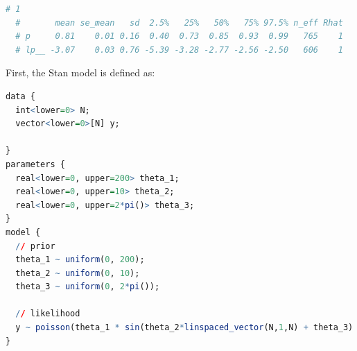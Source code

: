\documentclass{article}
\begin{document}



\begin{lstlisting}[language=R]
  # 1
  #       mean se_mean   sd  2.5%   25%   50%   75% 97.5% n_eff Rhat
  # p     0.81    0.01 0.16  0.40  0.73  0.85  0.93  0.99   765    1
  # lp__ -3.07    0.03 0.76 -5.39 -3.28 -2.77 -2.56 -2.50   606    1
\end{lstlisting}


First, the Stan model is defined as:
\begin{lstlisting}[language=R]
data {
  int<lower=0> N;
  vector<lower=0>[N] y;

}
parameters {
  real<lower=0, upper=200> theta_1;
  real<lower=0, upper=10> theta_2;
  real<lower=0, upper=2*pi()> theta_3;
}
model {
  // prior
  theta_1 ~ uniform(0, 200);
  theta_2 ~ uniform(0, 10);
  theta_3 ~ uniform(0, 2*pi());

  // likelihood
  y ~ poisson(theta_1 * sin(theta_2*linspaced_vector(N,1,N) + theta_3) + 1.1);
}
\end{lstlisting}
\end{document}
